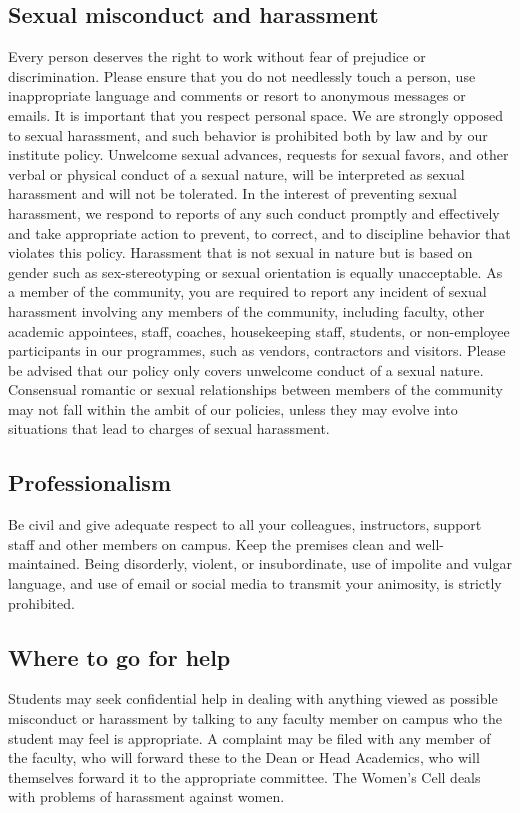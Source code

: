 \documentclass[a4paper]{extarticle}
\begin{document}
\subsection{Sexual misconduct and harassment}
Every person deserves the right to work without fear
of prejudice or discrimination. Please ensure that you do not needlessly touch a person, use
inappropriate language and comments or resort to anonymous messages or emails. It is
important that you respect personal space. We are strongly opposed to sexual harassment,
and such behavior is prohibited both by law and by our institute policy. Unwelcome sexual
advances, requests for sexual favors, and other verbal or physical conduct of a sexual nature,
will be interpreted as sexual harassment and will not be tolerated. In the interest of
preventing sexual harassment, we respond to reports of any such conduct promptly and
effectively and take appropriate action to prevent, to correct, and to discipline behavior that
violates this policy. Harassment that is not sexual in nature but is based on gender such as
sex-stereotyping or sexual orientation is equally unacceptable. As a member of the
community, you are required to report any incident of sexual harassment involving any
members of the community, including faculty, other academic appointees, staff, coaches,
housekeeping staff, students, or non-employee participants in our programmes, such as
vendors, contractors and visitors. Please be advised that our policy only covers unwelcome
conduct of a sexual nature. Consensual romantic or sexual relationships between members
of the community may not fall within the ambit of our policies, unless they may evolve into
situations that lead to charges of sexual harassment.

\subsection{Professionalism}
Be civil and give adequate respect to all your colleagues, instructors,
support staff and other members on campus. Keep the premises clean and well-maintained.
Being disorderly, violent, or insubordinate, use of impolite and vulgar language, and use of
email or social media to transmit your animosity, is strictly prohibited.

\subsection{Where to go for help} Students may seek confidential help in dealing
with anything viewed as possible misconduct or harassment by talking to any
faculty member on campus who the student may feel is appropriate. A complaint
may be filed with any member of the faculty, who will forward these to the Dean
or Head Academics, who will themselves forward it to the appropriate committee.
The Women's Cell deals with problems of harassment against women.
\end{document}
